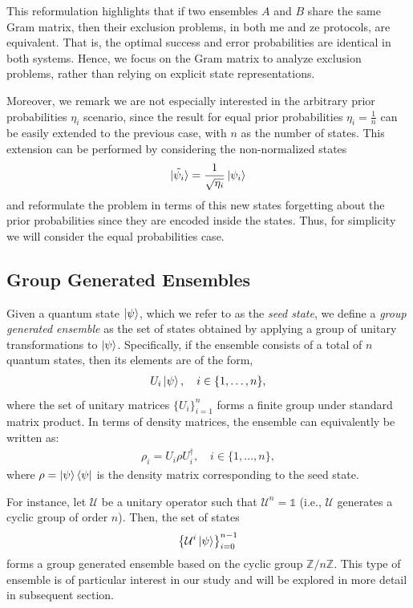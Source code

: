 \documentclass[12pt,letterpaper]{article}
\begin{document}
\begin{multicols}{2}
This reformulation highlights that if two ensembles $A$ and $B$ share the same Gram matrix, then their exclusion problems, in both \gls{me} and \gls{ze} protocols, are equivalent. That is, the optimal success and error probabilities are identical in both systems. Hence, we focus on the Gram matrix to analyze exclusion problems, rather than relying on explicit state representations.

Moreover, we remark we are not especially interested in the arbitrary prior probabilities $\eta_i$ scenario, since the result for equal prior probabilities $\eta_i=\frac{1}{n}$ can be easily extended to the previous case, with $n$ as the number of states. This extension can be performed by considering the non-normalized states
\begin{align*}
	\ket{\tilde{\psi_i}}=\frac{1}{\sqrt{\eta_i}}\ket{\psi_i}
\end{align*}
and reformulate the problem in terms of this new states forgetting about the prior probabilities since they are encoded inside the states. Thus, for simplicity we will consider the equal probabilities case.

\subsection{Group Generated Ensembles}\label{sectionGroupGeneratedEnsemble}

Given a quantum state $\ket{\psi}$, which we refer to as the \emph{seed state}, we define a \emph{group generated ensemble} as the set of states obtained by applying a group of unitary transformations to $\ket{\psi}$. Specifically, if the ensemble consists of a total of $n$ quantum states, then its elements are of the form,
\begin{align*}
	U_i\ket{\psi}, \quad i \in \{1, \dots, n\},
\end{align*}
where the set of unitary matrices $\{U_i\}_{i=1}^n$ forms a finite group under standard matrix product. In terms of density matrices, the ensemble can equivalently be written as:
\begin{align*}
	\rho_i = U_i \rho U_i^\dagger, \quad i \in \{1, \dots, n\},
\end{align*}
where $\rho = \ket{\psi}\bra{\psi}$ is the density matrix corresponding to the seed state.

For instance, let $\mathcal{U}$ be a unitary operator such that $\mathcal{U}^n = \mathds{1}$ (i.e., $\mathcal{U}$ generates a cyclic group of order $n$). Then, the set of states
\begin{align*}
	\left\{ \mathcal{U}^i\ket{\psi} \right\}_{i=0}^{n-1}
\end{align*}
forms a group generated ensemble based on the cyclic group $\mathbb{Z}/n\mathbb{Z}$. This type of ensemble is of particular interest in our study and will be explored in more detail in subsequent section.


\end{multicols}
\end{document}
